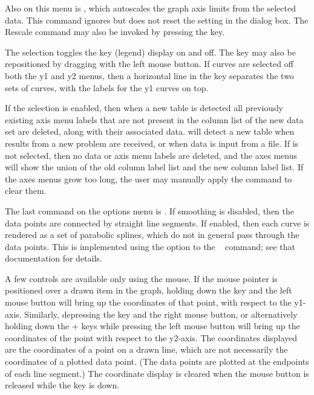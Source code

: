 Also on this menu is , which autoscales the
graph axis limits from the selected data.  This command ignores but does
not reset the  setting in the
 dialog box.  The Rescale command may
also be invoked by pressing the  key.

The  selection toggles the key (legend) display on
and off.  The key may also be repositioned by dragging with the left
mouse button.  If curves are selected off both the y1 and y2 menus, then
a horizontal line in the key separates the two sets of curves, with the
labels for the y1 curves on top.

If the  selection is enabled, then when a
new table is detected all previously existing axis menu labels that are
not present in the column list of the new data set are deleted, along
with their associated data.   will detect a new table when
results from a new problem are received, or when data is input from a
file.  If  is not selected, then no data or
axis menu labels are deleted, and the axes menus will show the union of
the old column label list and the new column label list.  If the axes
menus grow too long, the user may manually apply the
 command to clear them.

The last command on the options menu is .  If
smoothing is disabled, then the data points are connected by straight
line segments.  If enabled, then each curve is rendered as a set of
parabolic splines, which do not in general pass through the data points.
This is implemented using the  option to the
\Tcl\  command; see that documentation for
details.

A few controls are available only using the mouse.  If the mouse pointer
is positioned over a drawn item in the graph, holding down the
 key and the left mouse button will bring up the
coordinates of that point, with respect to the y1-axis.  Similarly,
depressing the  key and the right mouse button, or
alternatively holding down the + keys while
pressing the left mouse button will bring up the coordinates of the
point with respect to the y2-axis.  The coordinates displayed are the
coordinates of a point on a drawn line, which are not necessarily the
coordinates of a plotted data point.  (The data points are plotted at
the endpoints of each line segment.)  The coordinate display is cleared
when the mouse button is released while the  key is down.

